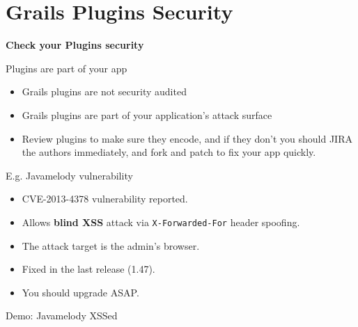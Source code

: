 
\section{Grails Plugins Security}

{
\begin{frame}[plain]
    \begin{center}
      \Huge\bfseries
      Check your Plugins security
    \end{center}
\end{frame}
}

\begin{frame}[plain]{Plugins are part of your app}
  \begin{itemize}%
    \item Grails plugins are not security audited
    \item Grails plugins are part of your application's attack surface
    \item Review plugins to make sure they encode, and if they don't you should JIRA the authors immediately, and fork and patch to fix your app quickly.
  \end{itemize}
\end{frame}

\begin{frame}{E.g. Javamelody vulnerability}
  \begin{itemize}%
    \item CVE-2013-4378 vulnerability reported.
    \item Allows \textbf{blind XSS} attack via \verb|X-Forwarded-For| header spoofing.
    \item The attack target is the admin's browser.
    \item Fixed in the last release (1.47).
    \item You should upgrade ASAP.
  \end{itemize}
\end{frame}

\begin{frame}{Demo: Javamelody XSSed}
  \begin{center}

  \end{center}

\end{frame}
